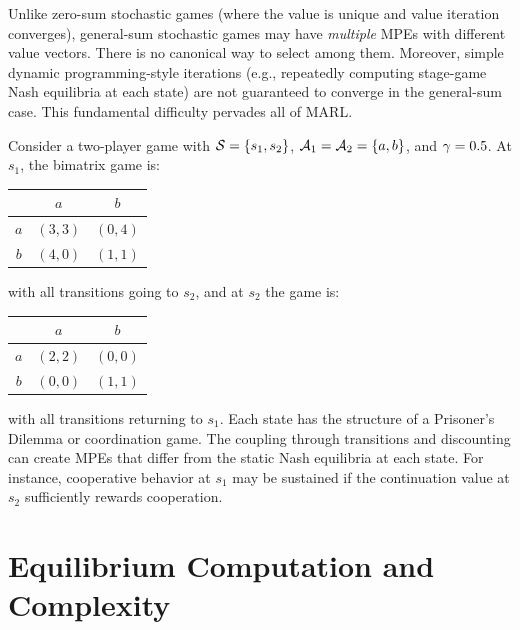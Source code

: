 \documentclass[11pt,a4paper]{article}
\begin{document}
\begin{warning}
Unlike zero-sum stochastic games (where the value is unique and
value iteration converges), general-sum stochastic games may have
\emph{multiple} MPEs with different value vectors.  There is no
canonical way to select among them.  Moreover, simple dynamic
programming-style iterations (e.g., repeatedly computing stage-game
Nash equilibria at each state) are not guaranteed to converge in the
general-sum case.  This fundamental difficulty pervades all of MARL.
\end{warning}

\begin{example}
\label{ex:general-sum}
Consider a two-player game with $\mathcal{S} = \{s_1, s_2\}$,
$\mathcal{A}_1 = \mathcal{A}_2 = \{a, b\}$, and $\gamma = 0.5$.
At $s_1$, the bimatrix game is:
\begin{center}
\begin{tabular}{c|cc}
  & $a$ & $b$ \\ \hline
  $a$ & $(3, 3)$ & $(0, 4)$ \\
  $b$ & $(4, 0)$ & $(1, 1)$
\end{tabular}
\end{center}
with all transitions going to $s_2$, and at $s_2$ the game is:
\begin{center}
\begin{tabular}{c|cc}
  & $a$ & $b$ \\ \hline
  $a$ & $(2, 2)$ & $(0, 0)$ \\
  $b$ & $(0, 0)$ & $(1, 1)$
\end{tabular}
\end{center}
with all transitions returning to $s_1$.  Each state has the
structure of a Prisoner's Dilemma or coordination game.  The coupling
through transitions and discounting can create MPEs that differ
from the static Nash equilibria at each state.  For instance,
cooperative behavior at $s_1$ may be sustained if the continuation
value at $s_2$ sufficiently rewards cooperation.
\end{example}

\section{Equilibrium Computation and Complexity}
\label{sec:complexity}
\end{document}
